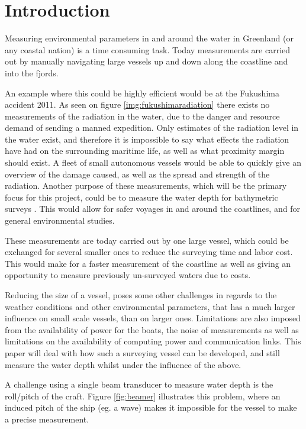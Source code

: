 \chapter{Introduction}
Measuring environmental parameters in and around the water in Greenland (or any coastal nation) is a time consuming task. Today measurements are carried out by manually navigating large vessels up and down along the coastline and into the fjords. 

An example where this could be highly efficient would be at the Fukushima accident 2011. As seen on figure \ref{img:fukushimaradiation} there exists no measurements of the radiation in the water, due to the danger and resource demand of sending a manned expedition. Only estimates of the radiation level in the water exist, and therefore it is impossible to say what effects the radiation have had on the surrounding maritime life, as well as what proximity margin should exist. A fleet of small autonomous vessels would be able to quickly give an overview of the damage caused, as well as the spread and strength of the radiation.
Another purpose of these measurements, which will be the primary focus for this project, could be to measure the water depth for bathymetric surveys \cite{StweartOceanography}. This would allow for safer voyages in and around the coastlines, and for general environmental studies. 

These measurements are today carried out by one large vessel, which could be exchanged for several smaller ones to reduce the surveying time and labor cost. This would make for a faster measurement of the coastline as well as giving an opportunity to measure previously un-surveyed waters due to costs. 

Reducing the size of a vessel, poses some other challenges in regards to the weather conditions and other environmental parameters, that has a much larger influence on small scale vessels, than on larger ones.
Limitations are also imposed from the availability of power for the boats,  the noise of measurements as well as limitations on the availability of computing power and communication links. This paper will deal with how such a surveying vessel can be developed, and still measure the water depth whilst under the influence of the above.

A challenge using a single beam transducer to measure water depth is the roll/pitch of the craft. Figure \vref{fig:beamer} illustrates this problem, where an induced pitch of the ship (eg. a wave) makes it impossible for the vessel to make a precise measurement.

